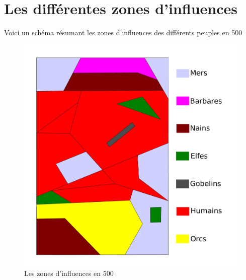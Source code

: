 
\section{Les différentes zones d'influences}
Voici un schéma résumant les zones d'influences des différents peuples en 500
\begin{figure}[ht]
\begin{center}
   \includegraphics[scale=0.0375]{./Ressources/medieval/influences.png}
   \caption{Les zones d'influences en 500}
\end{center}
\end{figure}

